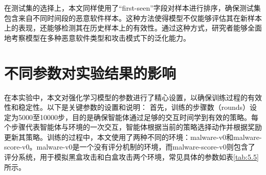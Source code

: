 在测试集的选择上，本文同样使用了“first-seen”字段对样本进行排序，确保测试集包含来自不同时间段的恶意软件样本。这种方法使得模型不仅能够评估其在新样本上的表现，还能够检测其在历史样本上的有效性。通过这种方式，研究者能够全面地考察模型在多种恶意软件类型和攻击模式下的泛化能力。


\section{不同参数对实验结果的影响}

在本实验中，本文对强化学习模型的参数进行了精心设置，以确保训练过程的有效性和稳定性。以下是关键参数的设置和说明：
首先，训练的步骤数（rounds）设定为5000至10000步，目的是确保智能体通过足够的交互时间学到有效的策略。每个步骤代表智能体与环境的一次交互，智能体根据当前的策略选择动作并根据奖励更新其策略。训练的过程中，本文使用了两种不同的环境：malware-v0和malware-score-v0。malware-v0是一个没有评分机制的环境，而malware-score-v0则包含了评分系统，用于模拟黑盒攻击和白盒攻击两个环境，常见具体的参数如表\ref{tab:5.5}所示。


